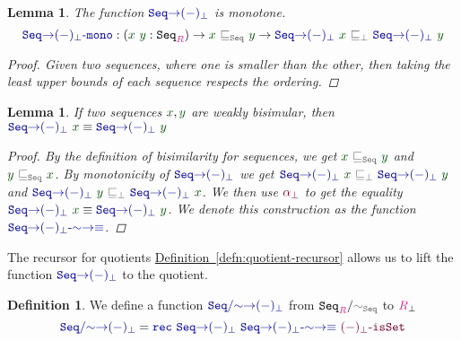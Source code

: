 \documentclass[twoside,11pt,openright]{report}
\theoremstyle{plain} %
\newtheorem{lem}[thm]{Lemma}
\theoremstyle{definition}
\newtheorem{defn}[thm]{Definition}%
\theoremstyle{remark}
\newcommand*{\defref}[1]{\hyperref[defn:#1]{Definition~\ref*{defn:#1}}}
\newcommand*{\term}[1]{\textcolor{green!30!black}{#1}} %
\newcommand*{\type}[1]{\textcolor{magenta!90!black}{#1}}
\newcommand*{\relation}[1]{\textcolor{gray!75!black}{\ensuremath{\mathtt{#1}}}}
\newcommand*{\function}[1]{\textcolor{blue!60!black}{\ensuremath{\mathtt{#1}}}}
\newcommand*{\constructor}[1]{\textcolor{purple!60!black}{\ensuremath{\mathtt{#1}}}}
\newcommand*{\typeformer}[1]{\ensuremath{\mathtt{#1}}}
\begin{document}
\begin{lem}
  The function \(\function{Seq{\rightarrow}(-)_\bot}\) is monotone. 
  \begin{equation}
    \function{Seq{\rightarrow}(-)_\bot\text{-}mono} : (\term{x}~\term{y} : \typeformer{Seq}_{\type{R}}) \rightarrow \term{x}~\relation{\sqsubseteq_{Seq}}~\term{y} \rightarrow \function{Seq{\rightarrow}(-)_\bot}~\term{x}~\relation{\sqsubseteq_{\bot}}~\function{Seq{\rightarrow}(-)_\bot}~\term{y}
\end{equation}
  \begin{proof}
    Given two sequences, where one is smaller than the other, then taking the least upper bounds of each sequence respects the ordering. %
  \end{proof}
\end{lem}
\begin{lem}
  If two sequences \(\term{x},\term{y}\) are weakly bisimular, then \(\function{Seq{\rightarrow}(-)_\bot}~\term{x} \equiv \function{Seq{\rightarrow}(-)_\bot}~\term{y}\)
  \begin{proof}
    By the definition of bisimilarity for sequences, we get \(\term{x}~\relation{\sqsubseteq_{Seq}}~\term{y}\) and \(\term{y}~\relation{\sqsubseteq_{Seq}}~\term{x}\). By monotonicity of \(\function{Seq{\rightarrow}(-)_{\bot}}\) we get \(\function{Seq{\rightarrow}(-)_\bot}~\term{x}~\relation{\sqsubseteq_{\bot}}~\function{Seq{\rightarrow}(-)_\bot}~\term{y}\) and \(\function{Seq{\rightarrow}(-)_\bot}~\term{y}~\relation{\sqsubseteq_{\bot}}~\function{Seq{\rightarrow}(-)_\bot}~\term{x}\). We then use \(\constructor{\alpha_{\bot}}\) to get the equality \(\function{Seq{\rightarrow}(-)_\bot}~\term{x} \equiv \function{Seq{\rightarrow}(-)_\bot}~\term{y}\). We denote this construction as the function \(\function{Seq{\rightarrow}(-)_\bot\text{-}{\sim}{\rightarrow}{\equiv}}\).
  \end{proof}
\end{lem}
\noindent The recursor for quotients \defref{quotient-recursor} allows us to lift the function \(\function{Seq{\rightarrow}(-)_\bot}\) to the quotient.
\begin{defn}
  \label{eq:QuotientedSeqToPartialityMonad}
  We define a function \(\function{Seq/{\sim}{\rightarrow}(-)_\bot}\) from \(\typeformer{Seq}_{\type{R}} / \relation{\sim_{Seq}}\) to \(\type{R}_{\bot}\)
  \begin{equation}
    \function{Seq/{\sim}{\rightarrow}(-)_\bot} = \function{rec}~\function{Seq{\rightarrow}(-)_\bot}~\function{Seq{\rightarrow}(-)_\bot\text{-}{\sim}{\rightarrow}{\equiv}}~\constructor{(-)_\bot\text{-}isSet}
  \end{equation} 
\end{defn}
\end{document}
